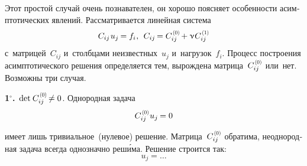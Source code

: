 
\begin{otherlanguage}{russian}

Этот простой случай очень познавателен, он хорошо поясняет особенности асимптотических явлений. Рассматривается линейная система
\begin{equation}
C_{ij} \hspace{.2ex} u_{j} \hspace{-0.16ex} = f_{i} \hspace{.1ex} , \:\:
C_{ij} \hspace{-0.2ex} = C_{ij}^{\hspace{0.2ex}\scalebox{0.66}[0.66]{(0)}} \hspace{-0.2ex} + \smallparameter \hspace{.1ex} C_{ij}^{\hspace{0.2ex}\scalebox{0.66}[0.66]{(1)}}
\end{equation}
\noindent с~матрицей~$C_{ij}$ и~столбцами неизвестных~$u_j$ и~нагрузок~$f_i$. Процесс построения асимптотического решения определяется тем, вырождена матрица~${C_{ij}^{\hspace{0.2ex}\scalebox{0.66}[0.66]{(0)}}}$ или~нет. Возможны три случая.

\indent \textbf{1$^{\circ}$\hspace{-1ex}.}\, ${\operatorname{det} \hspace{.16ex} C_{ij}^{\hspace{0.2ex}\scalebox{0.66}[0.66]{(0)}} \hspace{-0.25ex} \neq 0}$. Однородная задача
\vspace{-0.2em}\begin{equation}
C_{ij}^{\hspace{0.2ex}\scalebox{0.66}[0.66]{(0)}} \hspace{.1ex} u_{j} \hspace{-0.16ex} = 0
\end{equation}

\vspace{-0.5em} \noindent имеет лишь тривиальное~(нулевое) решение.
Матрица~${C_{ij}^{\hspace{0.2ex}\scalebox{0.66}[0.66]{(0)}}}$ обратима, неоднородная задача всегда однозначно реш\'{и}ма. Решение строится так:
\begin{equation}
u_{j} = \ldots
\end{equation}


\end{otherlanguage}
